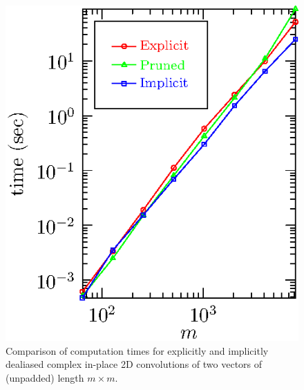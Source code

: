 \documentclass[final]{siamltex}
\begin{document}
\begin{figure}[htbp]
\begin{center}
\begin{minipage}{0.49\linewidth}
\begin{center}
\includegraphics{timing2c}
\caption{Comparison of computation times for explicitly and implicitly
dealiased complex in-place 2D convolutions of two vectors of
(unpadded) length $m\times m$.}
\label{timing2c}
\end{center}
\end{minipage}
%
\begin{minipage}{0.49\linewidth}
\begin{center}

\end{center}
\end{minipage}
\end{center}
\end{figure}
\end{document}
